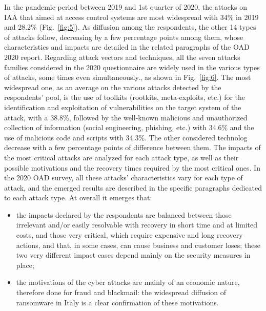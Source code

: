 \documentclass{easychair}
\begin{document}
In the pandemic period between 2019 and 1st quarter of 2020, the attacks on IAA that aimed at access control systems are most widespread with 34\% in 2019 and 28.2\% (Fig.~\ref{fig:5}).
As diffusion among the respondents, the other 14 types of attacks follow, decreasing by a few percentage points among them, whose characteristics and impacts are detailed in the related 
paragraphs of the OAD 2020 report. Regarding attack vectors and techniques, all the seven attacks families considered in the 2020 questionnaire are widely used in the various 
types of attacks, some times even simultaneously., as shown in Fig.~\ref{fig:6}. The most widespread one,
as an average on the various attacks detected by the respondents’ pool, is the use of toolkits (rootkits, meta-exploits, etc.) for the identification and exploitation of vulnerabilities
on the target system of the attack, with a 38.8\%, followed by the well-known malicious and unauthorized collection of information (social engineering, phishing, etc.) with 34.6\% 
and the use of malicious code and scripts with 34.3\%. The other considered technolog decrease with a few percentage points of difference between them. The impacts of the most 
critical attacks are analyzed for each attack type, as well as their possible motivations and the recovery times required by the most critical ones.
In the 2020 OAD survey, all these attacks’ characteristics vary for each type of attack, and the emerged results are described in the specific paragraphs dedicated to each attack 
type. At overall it emerges that:
\begin{itemize}
\item the impacts declared by the respondents are balanced between those irrelevant and/or easily resolvable with recovery in short time and at limited costs, and those very 
critical, which require expensive and long recovery actions, and that, in some cases, can cause business and customer loses; these two very different impact cases depend mainly 
on the security measures in place;

\item the motivations of the cyber attacks are mainly of an economic nature, therefore done for fraud and blackmail: the widespread diffusion of ransomware in Italy is a clear 
confirmation of these motivations.
\end{itemize}
\end{document}
